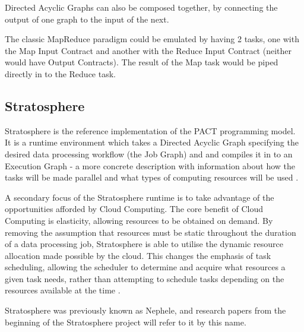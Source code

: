 Directed Acyclic Graphs can also be composed together, by connecting the output of one graph to the input of the next.

The classic MapReduce paradigm could be emulated by having 2 tasks, one with the Map Input Contract and another with the Reduce Input Contract (neither would have Output Contracts). The result of the Map task would be piped directly in to the Reduce task. 

\subsection{Stratosphere}
Stratosphere is the reference implementation of the PACT programming model. It is a runtime environment which takes a Directed Acyclic Graph specifying the desired data processing workflow (the Job Graph) and and compiles it in to an Execution Graph - a more concrete description with information about how the tasks will be made parallel and what types of computing resources will be used \cite{warneke2011exploiting}. 

A secondary focus of the Stratosphere runtime is to take advantage of the opportunities afforded by Cloud Computing. The core benefit of Cloud Computing is elasticity, allowing resources to be obtained on demand. By removing the assumption that resources must be static throughout the duration of a data processing job, Stratosphere is able to utilise the dynamic resource allocation made possible by the cloud. This changes the emphasis of task scheduling, allowing the scheduler to determine and acquire what resources a given task needs, rather than attempting to schedule tasks depending on the resources available at the time \cite{warneke2011exploiting}.

Stratosphere was previously known as Nephele, and research papers from the beginning of the Stratosphere project will refer to it by this name.




